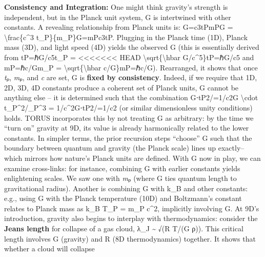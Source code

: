 \documentclass[]{article}
\begin{document}
\textbf{Consistency and Integration:} One might think gravity's strength
is independent, but in the Planck unit system, G is intertwined with
other constants. A revealing relationship from Planck units is:
G=c3tPmPG = \textbackslash{}frac\{c\^{}3 t\_P\}\{m\_P\}G=mP​c3tP​​​.
Plugging in the Planck time (1D), Planck mass (3D), and light speed (4D)
yields the observed G (this is essentially derived from tP=ℏG/c5t\_P =
<<<<<<< HEAD
\textbackslash sqrt\{\textbackslash hbar
G/c\^{}5\}tP\hspace{0pt}=ℏG/c5\hspace{0pt} and mP=ℏc/Gm\_P =
\textbackslash sqrt\{\textbackslash hbar
c/G\}mP\hspace{0pt}=ℏc/G\hspace{0pt}). Rearranged, it shows that once
\emph{t}ₚ, \emph{m}ₚ, and \emph{c} are set, G is \textbf{fixed by
consistency}\hspace{0pt}. Indeed, if we require that 1D, 2D, 3D, 4D
constants produce a coherent set of Planck units, G cannot be anything
else -- it is determined such that the combination G⋅tP2/=1/c2G
\textbackslash cdot t\_P\^{}2/\ell\_P\^{}3 =
1/c\^{}2G⋅tP2\hspace{0pt}/\hspace{0pt}=1/c2 (or similar dimensionless
unity conditions) holds\hspace{0pt}. TORUS incorporates this by not
treating G as arbitrary: by the time we ``turn on'' gravity at 9D, its
value is already harmonically related to the lower
constants\hspace{0pt}. In simpler terms, the prior recursion steps
``choose'' G such that the boundary between quantum and gravity (the
Planck scale) lines up exactly\hspace{0pt}-- which mirrors how nature's
Planck units are defined. With G now in play, we can examine
cross-links: for instance, combining G with earlier constants yields
enlightening scales. We saw one with \emph{m}ₚ (where G ties quantum
length to gravitational radius). Another is combining G with k\_B and
other constants: e.g., using G with the Planck temperature (10D) and
Boltzmann's constant relates to Planck mass as k\_B T\_P = m\_P c\^{}2,
implicitly involving G\hspace{0pt}. At 9D's introduction, gravity also
begins to interplay with thermodynamics: consider the \textbf{Jeans
length} for collapse of a gas cloud, λ\_J \textasciitilde{} √(R T/(G
ρ)). This critical length involves G (gravity) and R (8D thermodynamics)
together\hspace{0pt}. It shows that whether a cloud will collapse
\end{document}

